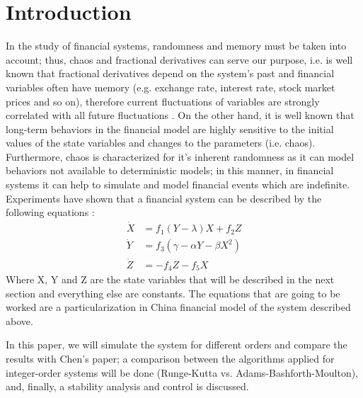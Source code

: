 \section{Introduction}
In the study of financial systems, randomness and memory must be taken into account; thus, chaos and fractional derivatives can serve our purpose, i.e. is well known that fractional derivatives depend on the system's past and financial variables often have memory (e.g. exchange rate, interest rate, stock market prices and so on), therefore current fluctuations of variables are strongly correlated with all future fluctuations \cite{main}. On the other hand, it is well known \cite{jun2001study} that long-term behaviors in the financial model are highly sensitive to the initial values of the state variables and changes to the parameters (i.e. chaos). Furthermore, chaos is characterized for it's inherent randomness as it can model behaviors not available to deterministic models; in this manner, in financial systems it can help to simulate and model financial events which are indefinite. Experiments have shown that a financial system can be described by the following equations \cite{jun2001study}: 
\begin{equation}
	\begin{array}{ll}
            \dot{X}&=f_1(Y-\lambda)X+f_2Z\\
            \dot{Y}&=f_3(\gamma - \alpha Y - \beta X^2)\\
            \dot{Z}&=-f_4Z-f_5X
    \end{array}
\end{equation}
Where X, Y and Z are the state variables that will be described in the next section and everything else are constants. The equations that are going to be worked are a particularization in China financial model of the system described above.

In this paper, we will simulate the system for different orders and compare the results with Chen's paper; a comparison between the algorithms applied for integer-order systems will be done (Runge-Kutta vs. Adams-Bashforth-Moulton), and, finally, a stability analysis and control is discussed.







